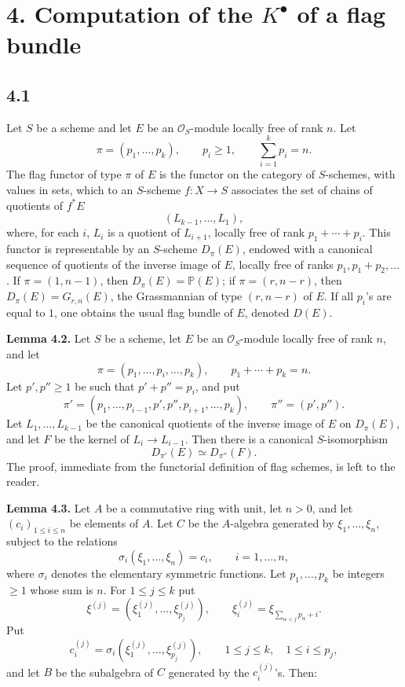 \documentclass[11pt]{article}
\begin{document}
\section*{4. Computation of the \(K^\bullet\) of a flag bundle}

\subsection*{4.1}
Let \(S\) be a scheme and let \(E\) be an \(\mathcal O_S\)-module locally free of rank \(n\). Let
\[
  \pi=(p_1,\ldots,p_k),\qquad p_i\geq 1,
  \qquad \sum_{i=1}^k p_i=n.
\]
The flag functor of type \(\pi\) of \(E\) is the functor on the category of \(S\)-schemes, with values in sets, which to an \(S\)-scheme \(f:X\to S\) associates the set of chains of quotients of \(f^*E\)
\[
  (L_{k-1},\ldots,L_1),
\]
where, for each \(i\), \(L_i\) is a quotient of \(L_{i+1}\), locally free of rank \(p_1+\cdots+p_i\). This functor is representable by an \(S\)-scheme \(D_\pi(E)\), endowed with a canonical sequence of quotients of the inverse image of \(E\), locally free of ranks \(p_1,p_1+p_2,\ldots\). If \(\pi=(1,n-1)\), then \(D_\pi(E)=\mathbb P(E)\); if \(\pi=(r,n-r)\), then \(D_\pi(E)=G_{r,n}(E)\), the Grassmannian of type \((r,n-r)\) of \(E\). If all \(p_i\)'s are equal to \(1\), one obtains the usual flag bundle of \(E\), denoted \(D(E)\).

\textbf{Lemma 4.2.} Let \(S\) be a scheme, let \(E\) be an \(\mathcal O_S\)-module locally free of rank \(n\), and let
\[
  \pi=(p_1,\ldots,p_i,\ldots,p_k),\qquad p_1+\cdots+p_k=n.
\]
Let \(p',p''\geq 1\) be such that \(p'+p''=p_i\), and put
\[
  \pi'=(p_1,\ldots,p_{i-1},p',p'',p_{i+1},\ldots,p_k),
  \qquad \pi''=(p',p'').
\]
Let \(L_1,\ldots,L_{k-1}\) be the canonical quotients of the inverse image of \(E\) on \(D_\pi(E)\), and let \(F\) be the kernel of \(L_i\to L_{i-1}\). Then there is a canonical \(S\)-isomorphism
\[
  D_{\pi'}(E)\simeq D_{\pi''}(F).
\]
The proof, immediate from the functorial definition of flag schemes, is left to the reader.

\textbf{Lemma 4.3.} Let \(A\) be a commutative ring with unit, let \(n>0\), and let \((c_i)_{1\leq i\leq n}\) be elements of \(A\). Let \(C\) be the \(A\)-algebra generated by \(\xi_1,\ldots,\xi_n\), subject to the relations
\[
  \sigma_i(\xi_1,\ldots,\xi_n)=c_i,
  \qquad i=1,\ldots,n,
\]
where \(\sigma_i\) denotes the elementary symmetric functions. Let \(p_1,\ldots,p_k\) be integers \(\geq 1\) whose sum is \(n\). For \(1\leq j\leq k\) put
\[
  \xi^{(j)}=(\xi^{(j)}_1,\ldots,\xi^{(j)}_{p_j}),
  \qquad
  \xi_i^{(j)}=\xi_{\sum_{\alpha<j}p_\alpha+i}.
\]
Put
\[
  c_i^{(j)}=\sigma_i(\xi^{(j)}_1,\ldots,\xi^{(j)}_{p_j}),
  \qquad 1\leq j\leq k,
  \quad 1\leq i\leq p_j,
\]
and let \(B\) be the subalgebra of \(C\) generated by the \(c_i^{(j)}\)'s. Then:
\end{document}
